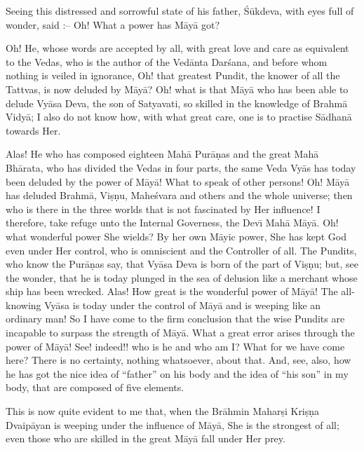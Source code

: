 Seeing this distressed and sorrowful state of his father, \'S\=ukdeva, with eyes full of wonder, said :-- Oh! What a power has M\=ay\=a got?

Oh! He, whose words are accepted by all, with great love and care as equivalent to the Vedas, who is the author of the Ved\=anta Dar\'sana, and before whom nothing is veiled in ignorance, Oh! that greatest Pundit, the knower of all the Tattvas, is now deluded by M\=ay\=a? Oh! what is that M\=ay\=a who has been able to delude Vy\=asa Deva, the son of Satyavati, so skilled in the knowledge of Brahm\=a Vidy\=a; I also do not know how, with what great care, one is to practise S\=adhan\=a towards Her.

Alas! He who has composed eighteen Mah\=a Pur\=a\d{n}as and the great Mah\=a Bh\=arata, who has divided the Vedas in four parts, the same Veda Vy\=as has today been deluded by the power of M\=ay\=a! What to speak of other persons! Oh! M\=ay\=a has deluded Brahm\=a, Vi\d{s}\d{n}u, Mahe\'svara and others and the whole universe; then who is there in the three worlds that is not fascinated by Her influence! I therefore, take refuge unto the Internal Governess, the Dev\={\i} Mah\=a M\=ay\=a. Oh! what wonderful power She wields? By her own M\=ayic power, She has kept God even under Her control, who is omniscient and the Controller of all. The Pundits, who know the Pur\=a\d{n}as say, that Vy\=asa Deva is born of the part of Vi\d{s}\d{n}u; but, see the wonder, that he is today plunged in the sea of delusion like a merchant whose ship has been wrecked. Alas! How great is the wonderful power of M\=ay\=a! The all-knowing Vy\=asa is today under the control of M\=ay\=a and is weeping like an ordinary man! So I have come to the firm conclusion that the wise Pundits are incapable to surpass the strength of M\=ay\=a. What a great error arises through the power of M\=ay\=a! See! indeed!! who is he and who am I? What for we have come here? There is no certainty, nothing whatsoever, about that. And, see, also, how he has got the nice idea of ``father'' on his body and the idea of ``his son'' in my body, that are composed of five elements.

This is now quite evident to me that, when the Br\=ahmin Mahar\d{s}i Kri\d{s}\d{n}a Dvaip\=ayan is weeping under the influence of M\=ay\=a, She is the strongest of all; even those who are skilled in the great M\=ay\=a fall under Her prey.


